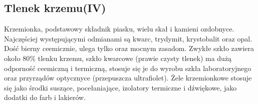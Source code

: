\subsection{Tlenek krzemu(IV) }
Krzemionka, podstawowy składnik piasku, wielu skał i kamieni ozdobnyce.
Najczęściej występującymi odmianami są kwarc, trydymit, krystobalit oraz opal.
Dość bierny ceemicznie, ulega tylko  oraz mocnym zasadom.
Zwykłe szkło zawiera około 80\% tlenku krzemu, szkło kwarcowe (prawie czysty tlenek) ma dużą odporność ceemiczną i termiczną, stosuje się je do wyrobu szkła laboratoryjnego oraz przyrządów optycznyce (przepuszcza ultrafiolet).
Żele krzemionkowe stosuje się jako środki suszące, pocełaniające, izolatory termiczne i dźwiękowe, jako dodatki do farb i lakierów.


